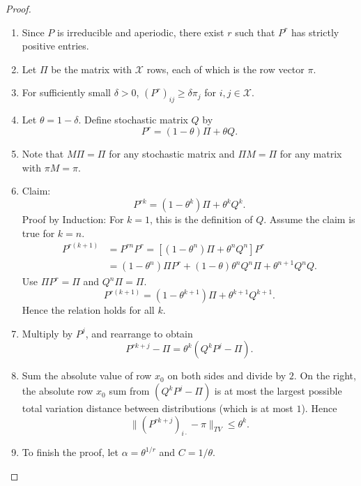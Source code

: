 \documentclass[12pt]{article}
\begin{document}
\begin{proof}
    \begin{enumerate}
        \item
            Since \( P \) is irreducible and aperiodic, there exist \( r
            \) such that \( P^r \) has strictly positive entries.
        \item
            Let \( \Pi \) be the matrix with \( \mathcal{X} \) rows,
            each of which is the row vector \( \pi \).
        \item
            For sufficiently small \( \delta > 0 \), \( (P^r)_{ij} \ge
            \delta \pi_{j} \) for \( i,j \in \mathcal{X} \).
        \item
            Let \( \theta = 1-\delta \).  Define stochastic matrix \( Q \)
            by
            \[
                P^r = (1 - \theta)\Pi + \theta Q.
            \]
        \item
            Note that \( M \Pi = \Pi \) for any stochastic matrix and \(
            \Pi M =\Pi \) for any matrix with \( \pi M = \pi \).
        \item
            Claim:
            \[
                P^{rk} = (1- \theta^{k})\Pi + \theta^k Q^k.
            \] Proof by Induction:  For \( k=1 \), this is the
            definition of \( Q \).  Assume the claim is true for \( k=n \).
            \begin{align*}
                P^{r(k+1)} &= P^{rn} P^r = [(1-\theta^n)\Pi + \theta^n Q^n]P^r
                \\
                &= (1-\theta^n)\Pi P^r + (1-\theta) \theta^n Q^n \Pi +
                \theta^{n+1} Q^n Q.
            \end{align*}
            Use \( \Pi P^r = \Pi \) and \( Q^n \Pi = \Pi \).
            \[
                P^{r(k+1)} = (1- \theta^{k+1})\Pi + \theta^{k+1} Q^{k+1}.
            \] Hence the relation holds for all \( k \).
        \item
            Multiply by \( P^j \), and rearrange to obtain
            \[
                P^{rk+j} - \Pi = \theta^k (Q^k P^j - \Pi).
            \]
        \item
            Sum the absolute value of row \( x_0 \) on both sides and
            divide by \( 2 \).  On the right, the absolute row \( x_0 \)
            sum from \( (Q^k P^j - \Pi) \) is at most the largest
            possible total variation distance between distributions (which
            is at most \( 1 \)).  Hence
            \[
                \| (P^{rk+j})_{i \cdot} - \pi \|_{TV} \le \theta^k.
            \]
        \item
            To finish the proof, let \( \alpha = \theta^{1/r} \) and \(
            C= 1/\theta \).
    \end{enumerate}
\end{proof}
\end{document}
